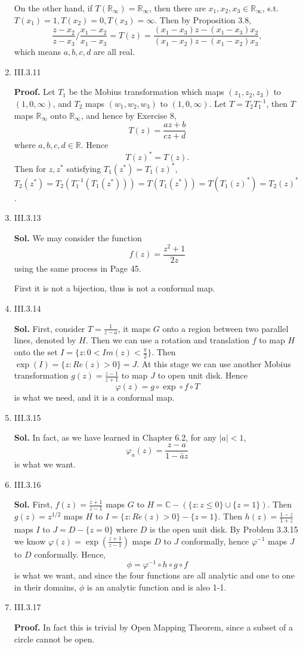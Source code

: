 \documentclass{article}%
\begin{document}
\begin{enumerate}
On the other hand, if $T(\mathbb{R}_\infty) = \mathbb{R}_\infty $, then there are $x_1, x_2, x_3\in\mathbb{R}_\infty $, s.t. $T(x_1) = 1, T(x_2) = 0, T(x_3) = \infty$. Then by Proposition 3.8,
$$
\frac{z-x_2}{z-x_3}/\frac{x_1-x_2}{x_1-x_3} = T(z) = \frac{(x_1-x_3)z - (x_1-x_3)x_2}{(x_1-x_2)z-(x_1-x_2)x_3},
$$
which means $a, b, c, d$ are all real.


\item III.3.11

\textbf{Proof.}
Let $T_1 $ be the Mobius transformation which maps $(z_1, z_2, z_3)$ to $(1, 0, \infty)$, and $T_2 $ maps $(w_1, w_2, w_3)$ to $(1, 0, \infty)$. Let $T = T_2T_1^{-1} $, then $T$ maps $\mathbb{R}_\infty $ onto $\mathbb{R}_\infty $, and hence by Exercise 8, 
$$
T(z) = \frac{az+b}{cz+d}
$$
where $a, b, c, d\in\mathbb{R}$. Hence 
$$
T(z)^* = T(z).
$$
Then for $z, z^* $ satisfying $T_1(z^*) = T_1(z)^* $, $T_2(z^*) = T_2(T_1^{-1}(T_1(z^*))) = T(T_1(z^*)) = T(T_1(z)^*) = T_2(z)^* $.

\item III.3.13

\textbf{Sol.}
We may consider the function
$$
f(z) = \frac{z^2+1}{2z}
$$
using the same process in Page 45.

First it is not a bijection, thus is not a conformal map.

\item III.3.14

\textbf{Sol.}
First, consider $T = \frac{1}{z-a}$, it maps $G$ onto a region between two parallel lines, denoted by $H$. Then we can use a rotation and translation $f$ to map $H$ onto the set $I = \{z: 0 < Im(z) < \frac{\pi}{2}\}$. Then $\exp(I) = \{z: Re(z) > 0\} = J$. At this stage we can use another Mobius transformation $g(z) = \frac{z-1}{z+1}$ to map $J$ to open unit disk. Hence
$$
\varphi(z) = g\circ \exp\circ f\circ T
$$
is what we need, and it is a conformal map.

\item III.3.15

\textbf{Sol.} In fact, as we have learned in Chapter 6.2, for any $|a| < 1$, 
$$
\varphi_a(z) = \frac{z-a}{1-\bar{a}z}
$$
is what we want.

\item III.3.16

\textbf{Sol.} First, $f(z) = \frac{z+1}{z-1}$ maps $G$ to $H = \mathbb{C} - (\{z: z\le 0\} \cup \{z = 1\})$. Then $g(z) = z^{1/2} $ maps $H$ to $I = \{z: Re(z) > 0\} - \{z = 1\}$. Then $h(z) = \frac{1-z}{1+z}$ maps $I$ to $J = D-\{z=0\}$ where $D$ is the open unit disk. By Problem 3.3.15 we know $\varphi(z) = \exp(\frac{z+1}{z-1})$ maps $D$ to $J$ conformally, hence $\varphi^{-1} $ maps $J$ to $D$ conformally. Hence, 
$$
\phi = \varphi^{-1}\circ h\circ g\circ f
$$
is what we want, and since the four functions are all analytic and one to one in their domains, $\phi$ is an analytic function and is also 1-1. 

\item III.3.17

\textbf{Proof.}
In fact this is trivial by Open Mapping Theorem, since a subset of a circle cannot be open.






\end{enumerate}
\end{document}
